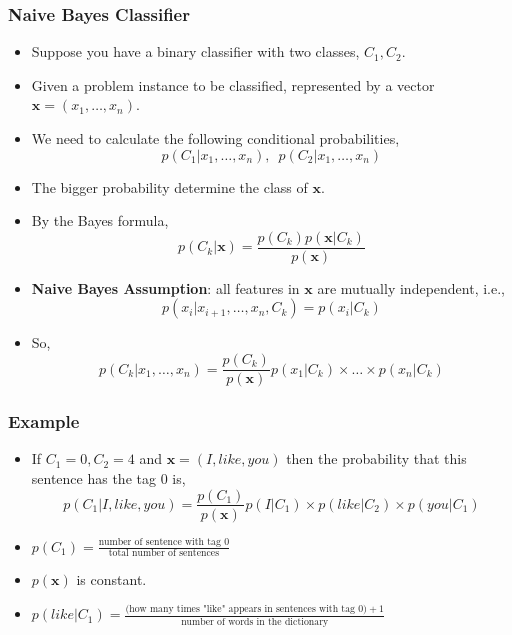 \documentclass[12pt,aspectratio=169]{beamer}
\begin{document}
\begin{frame}
\frametitle{Naive Bayes Classifier}
\begin{itemize}
\item Suppose you have a binary classifier with two classes, $C_1,C_2$.\pause
\bigskip
\item Given a problem instance to be classified, represented by a vector $\mathbf{x}=(x_1,\dots,x_n)$.\pause
\bigskip
\item We need to calculate the following conditional probabilities,
\[
p(C_1|x_1,\dots,x_n),\,\,\,p(C_2|x_1,\dots,x_n)
\]
\pause
\item The bigger probability determine the class of $\mathbf{x}$.
\end{itemize}
\end{frame}

\begin{frame}
\begin{itemize}
\item By the Bayes formula,
\[
p(C_k|\mathbf{x})=\frac{p(C_k)p(\mathbf{x}|C_k)}{p(\mathbf{x})}
\]\pause
\item \textbf{Naive Bayes Assumption}: all features in $\mathbf{x}$ are mutually independent, i.e.,
\[
p(x_i|x_{i+1},\dots,x_n,C_k)=p(x_i|C_k)
\]

\end{itemize}
\end{frame}

\begin{frame}
\begin{itemize}
\item So,
\[
p(C_k|x_1,\dots,x_n)=\frac{p(C_k)}{p(\mathbf{x})}p(x_1|C_k)\times \dots \times p(x_n|C_k)
\]
\end{itemize}
\end{frame}

\begin{frame}
\frametitle{Example}
\begin{itemize}
\item If $C_1=0,C_2=4$ and $\mathbf{x}=(I,like,you)$ then the probability that this sentence has the tag $0$ is,
\[
p(C_1|I,like,you)=\frac{p(C_1)}{p(\mathbf{x})}p(I|C_1)\times p(like|C_2)\times p(you|C_1)
\]
\item $p(C_1)=\frac{\text{number of sentence with tag 0}}{\text{total number of sentences}}$ \pause
\bigskip
\item $p(\mathbf{x})$ is constant.
\bigskip
\item $p(like|C_1)=\frac{\text{(how many times "like" appears in sentences with tag 0)}+1}{\text{number of words in the dictionary}}$
\end{itemize}
\end{frame}
\end{document}

